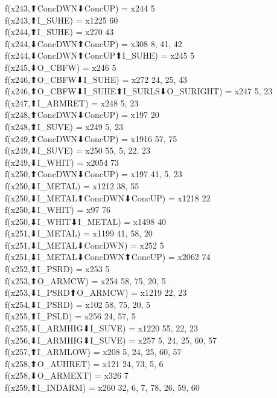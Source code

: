 f(x243,⬆ConcDWN⬇ConcUP) = x244 {5} \\
f(x243,⬆I_SUHE) = x1225 {60} \\
f(x244,⬆I_SUHE) = x270 {43} \\
f(x244,⬇ConcDWN⬆ConcUP) = x308 {8, 41, 42} \\
f(x244,⬇ConcDWN⬆ConcUP⬆I_SUHE) = x245 {5} \\
f(x245,⬇O_CBFW) = x246 {5} \\
f(x246,⬆O_CBFW⬇I_SUHE) = x272 {24, 25, 43} \\
f(x246,⬆O_CBFW⬇I_SUHE⬆I_SURLS⬇O_SURIGHT) = x247 {5, 23} \\
f(x247,⬆I_ARMRET) = x248 {5, 23} \\
f(x248,⬆ConcDWN⬇ConcUP) = x197 {20} \\
f(x248,⬆I_SUVE) = x249 {5, 23} \\
f(x249,⬆ConcDWN⬇ConcUP) = x1916 {57, 75} \\
f(x249,⬇I_SUVE) = x250 {55, 5, 22, 23} \\
f(x249,⬇I_WHIT) = x2054 {73} \\
f(x250,⬆ConcDWN⬇ConcUP) = x197 {41, 5, 23} \\
f(x250,⬇I_METAL) = x1212 {38, 55} \\
f(x250,⬇I_METAL⬆ConcDWN⬇ConcUP) = x1218 {22} \\
f(x250,⬇I_WHIT) = x97 {76} \\
f(x250,⬇I_WHIT⬇I_METAL) = x1498 {40} \\
f(x251,⬇I_METAL) = x1199 {41, 58, 20} \\
f(x251,⬇I_METAL⬇ConcDWN) = x252 {5} \\
f(x251,⬇I_METAL⬇ConcDWN⬆ConcUP) = x2062 {74} \\
f(x252,⬆I_PSRD) = x253 {5} \\
f(x253,⬆O_ARMCW) = x254 {58, 75, 20, 5} \\
f(x253,⬇I_PSRD⬆O_ARMCW) = x1219 {22, 23} \\
f(x254,⬇I_PSRD) = x102 {58, 75, 20, 5} \\
f(x255,⬆I_PSLD) = x256 {24, 57, 5} \\
f(x255,⬇I_ARMHIG⬇I_SUVE) = x1220 {55, 22, 23} \\
f(x256,⬇I_ARMHIG⬇I_SUVE) = x257 {5, 24, 25, 60, 57} \\
f(x257,⬆I_ARMLOW) = x208 {5, 24, 25, 60, 57} \\
f(x258,⬆O_AUHRET) = x121 {24, 73, 5, 6} \\
f(x258,⬇O_ARMEXT) = x326 {7} \\
f(x259,⬆I_INDARM) = x260 {32, 6, 7, 78, 26, 59, 60} \\
